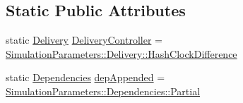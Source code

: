 \subsection*{Static Public Attributes}
\begin{DoxyCompactItemize}
\item 
static \hyperlink{class_simulation_parameters_ae08444273809241f502aa422205f7307}{Delivery} \hyperlink{class_simulation_parameters_ab379e91439dd9d4179096d30f930d459}{Delivery\+Controller} = \hyperlink{class_simulation_parameters_ae08444273809241f502aa422205f7307a9a46ad9fb926b8b78ba9395f96aa6af0}{Simulation\+Parameters\+::\+Delivery\+::\+Hash\+Clock\+Difference}
\item 
static \hyperlink{class_simulation_parameters_afb3b6aaecd4b19ef1991c870c8402dff}{Dependencies} \hyperlink{class_simulation_parameters_ad0c30ae3194fb07ca8a456331fce1add}{dep\+Appended} = \hyperlink{class_simulation_parameters_afb3b6aaecd4b19ef1991c870c8402dffa44ffd38a6dea695cbe2b34efdcc6cf27}{Simulation\+Parameters\+::\+Dependencies\+::\+Partial}
\end{DoxyCompactItemize}
